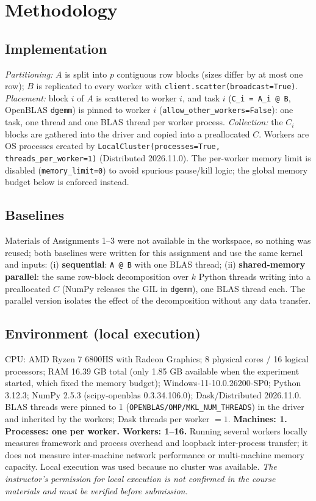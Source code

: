 \documentclass[10pt,a4paper]{article}
\begin{document}
\section{Methodology}
\subsection{Implementation}
\emph{Partitioning:} $A$ is split into $p$ contiguous row blocks (sizes differ by at most one row); $B$ is replicated to every worker with \texttt{client.scatter(broadcast=True)}.
\emph{Placement:} block $i$ of $A$ is scattered to worker $i$, and task $i$ (\texttt{C\_i = A\_i @ B}, OpenBLAS \texttt{dgemm}) is pinned to worker $i$ (\texttt{allow\_other\_workers=False}): one task, one thread and one BLAS thread per worker process.
\emph{Collection:} the $C_i$ blocks are gathered into the driver and copied into a preallocated $C$.
Workers are OS processes created by \texttt{LocalCluster(processes=True, threads\_per\_worker=1)} (Distributed 2026.11.0). The per-worker memory limit is disabled (\texttt{memory\_limit=0}) to avoid spurious pause/kill logic; the global memory budget below is enforced instead.

\subsection{Baselines}
Materials of Assignments 1--3 were not available in the workspace, so nothing was reused; both baselines were written for this assignment and use the same kernel and inputs: (i) \textbf{sequential}: \texttt{A @ B} with one BLAS thread; (ii) \textbf{shared-memory parallel}: the same row-block decomposition over $k$ Python threads writing into a preallocated $C$ (NumPy releases the GIL in \texttt{dgemm}), one BLAS thread each. The parallel version isolates the effect of the decomposition without any data transfer.

\subsection{Environment (local execution)}
CPU: AMD Ryzen 7 6800HS with Radeon Graphics; 8 physical cores / 16 logical processors; RAM 16.39 GB total (only 1.85 GB available when the experiment started, which fixed the memory budget); Windows-11-10.0.26200-SP0; Python 3.12.3; NumPy 2.5.3 (scipy-openblas 0.3.34.106.0); Dask/Distributed 2026.11.0. BLAS threads were pinned to 1 (\texttt{OPENBLAS/OMP/MKL\_NUM\_THREADS}) in the driver and inherited by the workers; Dask threads per worker $=1$.
\textbf{Machines: 1. Processes: one per worker. Workers: 1--16.} Running several workers locally measures framework and process overhead and loopback inter-process transfer; it does not measure inter-machine network performance or multi-machine memory capacity.
Local execution was used because no cluster was available. \emph{The instructor's permission for local execution is not confirmed in the course materials and must be verified before submission.}
\end{document}
